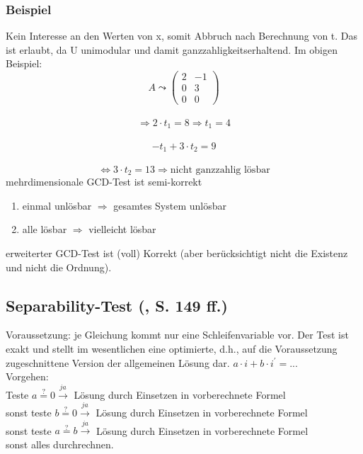 \subsubsection{Beispiel}
Kein Interesse an den Werten von x, somit Abbruch nach Berechnung von t. Das ist erlaubt, da U unimodular und damit \glqq ganzzahligkeitserhaltend\grqq .
Im obigen Beispiel:\\
\[ A \leadsto
\begin{pmatrix}
2 &  -1 \\
0 & 3 \\
0 & 0
\end{pmatrix}
\] \\
\[\Rightarrow 2 \cdot t_1 = 8 \Rightarrow t_1 = 4 \] \\
\[-t_1 + 3 \cdot t_2 = 9 \] \\
\[\Leftrightarrow 3 \cdot t_2 = 13 \Rightarrow \text{nicht ganzzahlig lösbar}
\]
mehrdimensionale GCD-Test ist \glqq semi-korrekt\grqq \\
\begin{enumerate}
  \item einmal unlösbar \( \Rightarrow \) gesamtes System unlösbar
  \item alle lösbar \( \Rightarrow \) vielleicht lösbar
\end{enumerate}
erweiterter GCD-Test ist (voll) Korrekt (aber berücksichtigt nicht die Existenz und nicht die Ordnung).


\subsection{Separability-Test (\cite{Zima90}, S. 149 ff.)}

Voraussetzung: je Gleichung kommt nur eine Schleifenvariable vor.  Der
Test ist exakt und stellt im wesentlichen eine optimierte, d.h., auf die
Voraussetzung zugeschnittene Version der allgemeinen Lösung dar.
\( a \cdot i + b \cdot i^\prime = \text{...} \) \\
Vorgehen:\\
Teste \(a \stackrel{?}{=} 0 \stackrel{ja}{\rightarrow} \) Lösung durch Einsetzen in vorberechnete Formel\\
sonst teste \(b \stackrel{?}{=} 0 \stackrel{ja}{\rightarrow} \) Lösung durch Einsetzen in vorberechnete Formel\\
sonst teste \(a \stackrel{?}{=} b \stackrel{ja}{\rightarrow} \) Lösung durch Einsetzen in vorberechnete Formel\\
sonst alles durchrechnen.


